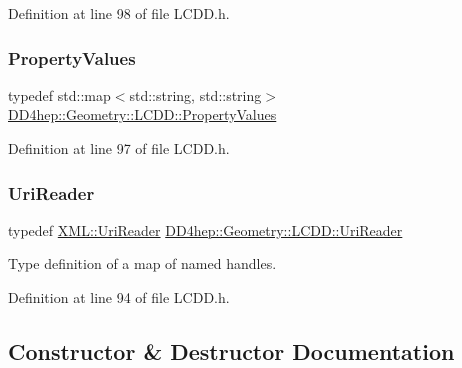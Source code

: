 Definition at line 98 of file L\+C\+D\+D.\+h.

\hypertarget{class_d_d4hep_1_1_geometry_1_1_l_c_d_d_a2a0388e0d76c73a3582439953ac3be53}{}\label{class_d_d4hep_1_1_geometry_1_1_l_c_d_d_a2a0388e0d76c73a3582439953ac3be53} 
\subsubsection{\texorpdfstring{Property\+Values}{PropertyValues}}
{\footnotesize\ttfamily typedef std\+::map$<$std\+::string, std\+::string$>$ \hyperlink{class_d_d4hep_1_1_geometry_1_1_l_c_d_d_a2a0388e0d76c73a3582439953ac3be53}{D\+D4hep\+::\+Geometry\+::\+L\+C\+D\+D\+::\+Property\+Values}}



Definition at line 97 of file L\+C\+D\+D.\+h.

\hypertarget{class_d_d4hep_1_1_geometry_1_1_l_c_d_d_a69f1e3e4fbcef1d57f1df1c2bd85918f}{}\label{class_d_d4hep_1_1_geometry_1_1_l_c_d_d_a69f1e3e4fbcef1d57f1df1c2bd85918f} 
\subsubsection{\texorpdfstring{Uri\+Reader}{UriReader}}
{\footnotesize\ttfamily typedef \hyperlink{class_d_d4hep_1_1_x_m_l_1_1_uri_reader}{X\+M\+L\+::\+Uri\+Reader} \hyperlink{class_d_d4hep_1_1_geometry_1_1_l_c_d_d_a69f1e3e4fbcef1d57f1df1c2bd85918f}{D\+D4hep\+::\+Geometry\+::\+L\+C\+D\+D\+::\+Uri\+Reader}}



Type definition of a map of named handles. 



Definition at line 94 of file L\+C\+D\+D.\+h.



\subsection{Constructor \& Destructor Documentation}
\hypertarget{class_d_d4hep_1_1_geometry_1_1_l_c_d_d_ad0d1630bbdef5d450099a08ec1ac9451}{}\label{class_d_d4hep_1_1_geometry_1_1_l_c_d_d_ad0d1630bbdef5d450099a08ec1ac9451} 
